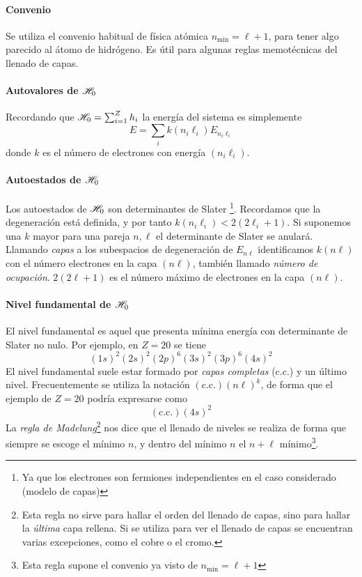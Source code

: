\paragraph{Convenio}
Se utiliza el convenio habitual de física atómica
$n_{\text{min}}=\ell+1$, para tener algo parecido al átomo
de hidrógeno. Es útil para algunas reglas memotécnicas del
llenado de capas.

\paragraph{Autovalores de $\mathscr{H}_0$}
Recordando que $\mathscr{H}_0 = \sum_{i=1}^Zh_i$ la energía del sistema es simplemente
\begin{equation}
  E = \sum_{i} k(n_i\ell_i) E_{n_i\ell_i}
\end{equation}
donde $k$ es el número de electrones con energía $(n_i\ell_i)$. 

\paragraph{Autoestados de $\mathscr{H}_0$}
Los autoestados de $\mathscr{H}_0$ son determinantes de Slater
\footnote{Ya que los electrones son fermiones independientes en el
  caso considerado (modelo de capas)}.
Recordamos que la degeneración está definida, y por tanto
$k(n_i\ell_i)<2(2\ell_i+1)$. Si suponemos una $k$ mayor para una pareja $n,\ell$ el determinante de Slater se anulará.
Llamando \emph{capas} a los subespacios de degeneración de $E_{n\ell}$ identificamos
$k(n\ell)$ con el número electrones en la capa $(n\ell)$, también
llamado \emph{número de ocupación}.
$2(2\ell+1)$ es el número máximo de electrones en la capa $(n\ell)$.


\paragraph{Nivel fundamental de $\mathscr{H}_0$}
El nivel fundamental es aquel que presenta mínima energía con
determinante de Slater no nulo. Por ejemplo, en $Z=20$ se tiene
\begin{equation*}
  (1s)^2(2s)^2(2p)^6(3s)^2(3p)^6(4s)^2
\end{equation*}
El nivel fundamental suele estar formado por \emph{capas completas}
(c.c.) y un último nivel. Frecuentemente se utiliza la notación
$(\text{c.c.})(n\ell)^k$, de forma que el ejemplo de $Z=20$ podría
expresarse como
\begin{equation*}
  (\text{c.c.})(4s)^2
\end{equation*}
La \emph{regla de Madelung}\footnote{Esta regla no sirve para hallar el
  orden del llenado de capas, sino para hallar la \emph{última} capa rellena.
  Si se utiliza para ver el llenado de capas se encuentran varias
  excepciones, como el cobre o el cromo.} nos dice que el llenado de
niveles se realiza de forma que siempre se escoge el mínimo $n$, y dentro del mínimo $n$ el $n+\ell$ mínimo\footnote{Esta regla
  supone el convenio ya visto de $n_{\text{min}}=\ell+1$}.


